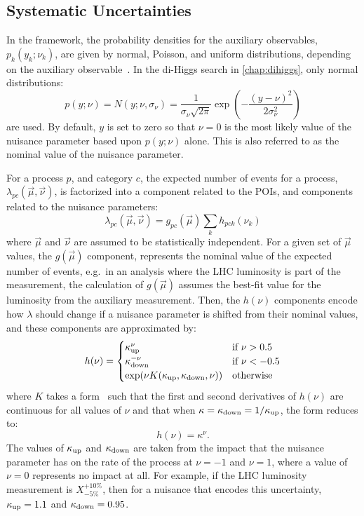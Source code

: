 \subsection{Systematic Uncertainties}\label{sec:stats_systematics}
In the \COMBINE framework, the probability densities for the auxiliary observables, $p_k(y_k;\nu_k)$, are given by normal, Poisson, and uniform distributions, depending on the auxiliary observable~\cite{CMS:2024onh}. In the di-Higgs search in \cref{chap:dihiggs}, only normal distributions:
\begin{equation}
  p(y;\nu) = N(y;\nu,\sigma_\nu) = \frac{1}{\sigma_\nu\sqrt{2\pi}}\exp\left(-\frac{(y-\nu)^2}{2\sigma_\nu^2}\right)
\end{equation}
are used. By default, $y$ is set to zero so that $\nu=0$ is the most likely value of the nuisance parameter based upon $p(y;\nu)$ alone. This is also referred to as the nominal value of the nuisance parameter.  

For a process $p$, and category $c$, the expected number of events for a process, $\lambda_{pc}({\vec{\mu},\vec{\nu}})$, is factorized into a component related to the POIs, and components related to the nuisance parameters:
\begin{equation}
  \lambda_{pc}(\vec{\mu},\vec{\nu}) = g_{pc}(\vec{\mu}) \sum_k h_{pck}(\nu_k)
  \label{eq:lambda_definition}
\end{equation}
where $\vec{\mu}$ and $\vec{\nu}$ are assumed to be statistically independent. For a given set of $\vec{\mu}$ values, the $g(\vec{\mu})$ component, represents the nominal value of the expected number of events, e.g.\ in an analysis where the LHC luminosity is part of the measurement, the calculation of $g(\vec{\mu})$ assumes the best-fit value for the luminosity from the auxiliary measurement. Then, the $h(\nu)$ components encode how $\lambda$ should change if a nuisance parameter is shifted from their nominal values, and these components are approximated by:
\begin{equation}
  h(\nu) = \begin{cases}
    \kappa_{\text{up}}^\nu & \text{if } \nu > 0.5 \\
    \kappa_{\text{down}}^{-\nu} & \text{if } \nu < -0.5 \\
    \exp(\nu K(\kappa_{\text{up}},\kappa_{\text{down}},\nu)) & \text{otherwise}
  \end{cases}
  \label{eq:kappa_definition}
\end{equation}
where $K$ takes a form~\cite{CMS:2024onh} such that the first and second derivatives of $h(\nu)$ are continuous for all values of $\nu$ and that when $\kappa = \kappa_{\text{down}} = 1/\kappa_{\text{up}}$, the form reduces to:
\begin{equation}
  h(\nu) = \kappa^\nu.
\end{equation}
The values of $\kappa_{\text{up}}$ and $\kappa_{\text{down}}$ are taken from the impact that the nuisance parameter has on the rate of the process at $\nu=-1$ and $\nu=1$, where a value of $\nu=0$ represents no impact at all. For example, if the LHC luminosity measurement is $X^{+10\%}_{-5\%}$, then for a nuisance that encodes this uncertainty, $\kappa_{\text{up}}=1.1$ and $\kappa_{\text{down}}=0.95$.

